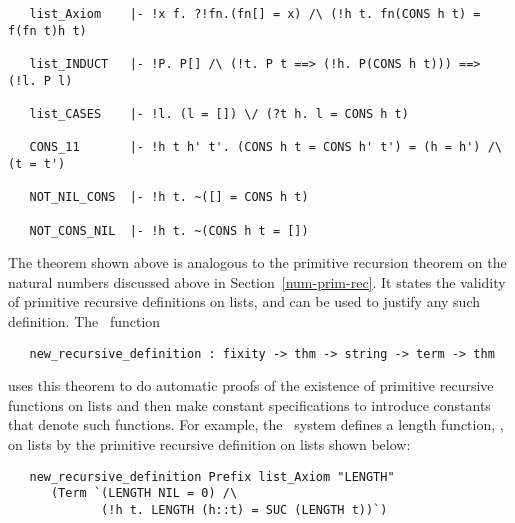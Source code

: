 \begin{hol}
\begin{verbatim}
   list_Axiom    |- !x f. ?!fn.(fn[] = x) /\ (!h t. fn(CONS h t) = f(fn t)h t)

   list_INDUCT   |- !P. P[] /\ (!t. P t ==> (!h. P(CONS h t))) ==> (!l. P l)

   list_CASES    |- !l. (l = []) \/ (?t h. l = CONS h t)

   CONS_11       |- !h t h' t'. (CONS h t = CONS h' t') = (h = h') /\ (t = t')

   NOT_NIL_CONS  |- !h t. ~([] = CONS h t)

   NOT_CONS_NIL  |- !h t. ~(CONS h t = [])
\end{verbatim}\end{hol}

The theorem    shown  above  is  analogous   to  the  primitive
recursion theorem on the
natural numbers discussed above in
Section~\ref{num-prim-rec}.  It  states  the  validity  of  primitive recursive
definitions on lists, and can be used to justify any such definition.  The \ML\
function

\begin{boxed}
\begin{verbatim}
   new_recursive_definition : fixity -> thm -> string -> term -> thm
\end{verbatim}\end{boxed}

\noindent uses this theorem to do automatic
 proofs of the existence of primitive
recursive functions on lists and then make constant specifications to introduce
constants that  denote  such  functions.  For example, the \HOL\ system defines
a length function, \ml{LENGTH}, on lists by the primitive recursive
definition on lists shown below:

\begin{hol}\begin{verbatim}
   new_recursive_definition Prefix list_Axiom "LENGTH"
      (Term `(LENGTH NIL = 0) /\
             (!h t. LENGTH (h::t) = SUC (LENGTH t))`)
\end{verbatim}\end{hol}

